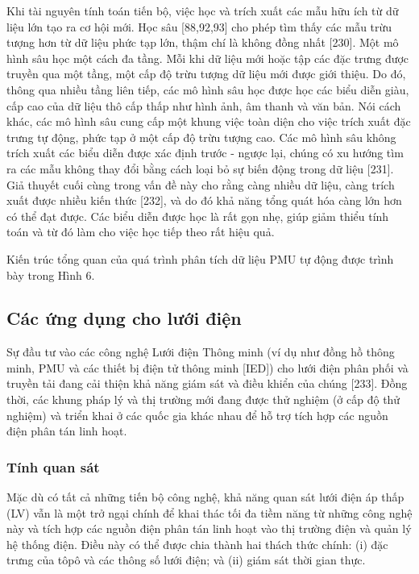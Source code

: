 \documentclass[utf8]{frontiersSCNS} %
\begin{document}
Khi tài nguyên tính toán tiến bộ, việc học và trích xuất các mẫu hữu ích từ dữ liệu lớn tạo ra cơ hội mới. Học sâu [88,92,93] cho phép tìm thấy các mẫu trừu tượng hơn từ dữ liệu phức tạp lớn, thậm chí là không đồng nhất [230]. Một mô hình sâu học một cách đa tầng. Mỗi khi dữ liệu mới hoặc tập các đặc trưng được truyền qua một tầng, một cấp độ trừu tượng dữ liệu mới được giới thiệu. Do đó, thông qua nhiều tầng liên tiếp, các mô hình sâu học được học các biểu diễn giàu, cấp cao của dữ liệu thô cấp thấp như hình ảnh, âm thanh và văn bản. Nói cách khác, các mô hình sâu cung cấp một khung việc toàn diện cho việc trích xuất đặc trưng tự động, phức tạp ở một cấp độ trừu tượng cao. Các mô hình sâu không trích xuất các biểu diễn được xác định trước - ngược lại, chúng có xu hướng tìm ra các mẫu không thay đổi bằng cách loại bỏ sự biến động trong dữ liệu [231]. Giả thuyết cuối cùng trong vấn đề này cho rằng càng nhiều dữ liệu, càng trích xuất được nhiều kiến thức [232], và do đó khả năng tổng quát hóa càng lớn hơn có thể đạt được. Các biểu diễn được học là rất gọn nhẹ, giúp giảm thiểu tính toán và từ đó làm cho việc học tiếp theo rất hiệu quả.

Kiến trúc tổng quan của quá trình phân tích dữ liệu PMU tự động được trình bày trong Hình 6.


\subsection{Các ứng dụng cho lưới điện}
Sự đầu tư vào các công nghệ Lưới điện Thông minh (ví dụ như đồng hồ thông minh, PMU và các thiết bị điện tử thông minh [IED]) cho lưới điện phân phối và truyền tải đang cải thiện khả năng giám sát và điều khiển của chúng [233]. Đồng thời, các khung pháp lý và thị trường mới đang được thử nghiệm (ở cấp độ thử nghiệm) và triển khai ở các quốc gia khác nhau để hỗ trợ tích hợp các nguồn điện phân tán linh hoạt.

\subsubsection{Tính quan sát}
Mặc dù có tất cả những tiến bộ công nghệ, khả năng quan sát lưới điện áp thấp (LV) vẫn là một trở ngại chính để khai thác tối đa tiềm năng từ những công nghệ này và tích hợp các nguồn điện phân tán linh hoạt vào thị trường điện và quản lý hệ thống điện. Điều này có thể được chia thành hai thách thức chính: (i) đặc trưng của tôpô và các thông số lưới điện; và (ii) giám sát thời gian thực.
\end{document}
